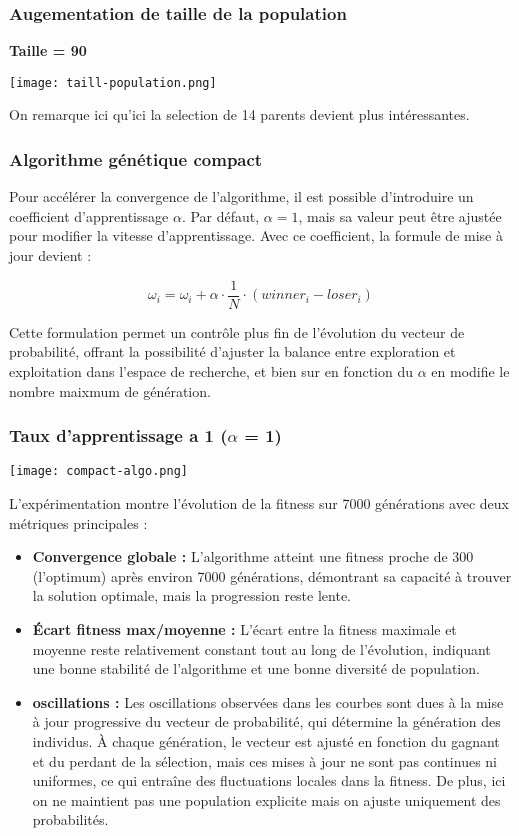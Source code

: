 \documentclass{article}
\begin{document}
\subsubsection{Augementation de taille de la population}
\textbf{Taille = 90}

\texttt{[image: taill-population.png]}

On remarque ici qu'ici la selection de 14 parents devient plus intéressantes.

\subsubsection{Algorithme génétique compact}

Pour accélérer la convergence de l'algorithme, il est possible d'introduire un coefficient d'apprentissage $\alpha$. Par défaut, $\alpha = 1$, mais sa valeur peut être ajustée pour modifier la vitesse d'apprentissage. Avec ce coefficient, la formule de mise à jour devient :

\[
    \omega_i = \omega_i + \alpha \cdot \frac{1}{N} \cdot (winner_i - loser_i)
\]

Cette formulation permet un contrôle plus fin de l'évolution du vecteur de probabilité, offrant la possibilité d'ajuster la balance entre exploration et exploitation dans l'espace de recherche, et bien sur en fonction du $\alpha$ en modifie le nombre maixmum de génération.

\subsubsection{Taux d'apprentissage a 1 ($\alpha$ = 1)}
\texttt{[image: compact-algo.png]}

L'expérimentation montre l'évolution de la fitness sur 7000 générations avec deux métriques principales :

\begin{itemize}
    \item \textbf{Convergence globale :} L'algorithme atteint une fitness proche de 300 (l'optimum) après environ 7000 générations, démontrant sa capacité à trouver la solution optimale, mais la progression reste lente.

    \item \textbf{Écart fitness max/moyenne :} L'écart entre la fitness maximale et moyenne reste relativement constant tout au long de l'évolution, indiquant une bonne stabilité de l'algorithme et une bonne diversité de population.

    \item \textbf{oscillations :} Les oscillations observées dans les courbes sont dues à la mise à jour progressive du vecteur de probabilité, qui détermine la génération des individus. À chaque génération, le vecteur est ajusté en fonction du gagnant et du perdant de la sélection, mais ces mises à jour ne sont pas continues ni uniformes, ce qui entraîne des fluctuations locales dans la fitness. De plus, ici on ne maintient pas une population explicite mais on ajuste uniquement des probabilités.
\end{itemize}
\end{document}
